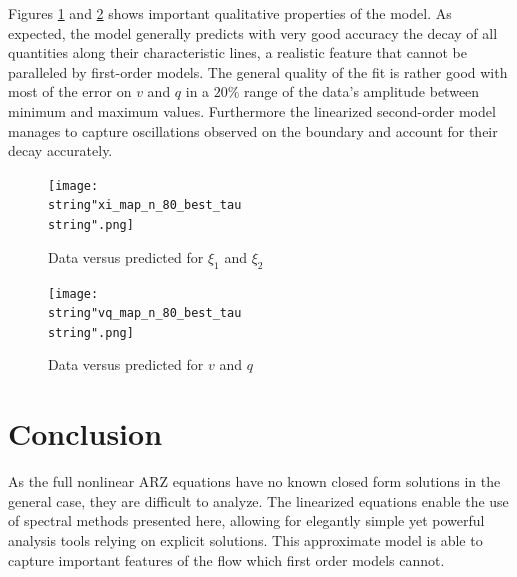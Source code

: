 \documentclass[a4paper, 10pt, conference]{ieeeconf}      %
\begin{document}
Figures \ref{fig:xi_1_xi_2_data_vs_sim} and \ref{fig:v_q_data_vs_sim} shows important qualitative properties of the model. As expected, the model generally predicts with very good accuracy the decay of all quantities along their characteristic lines, a realistic feature that cannot be paralleled by first-order models. The general quality of the fit is rather good with most of the error on $v$ and $q$ in a $20\%$ range of the data's amplitude between minimum and maximum values. Furthermore the linearized second-order model manages to capture oscillations observed on the boundary and account for their decay accurately.

\begin{figure}
\centering
\texttt{[image: \\string"xi\_map\_n\_80\_best\_tau\\string".png]}
\protect\caption{Data versus predicted for $\xi_1$ and $\xi_2$\label{fig:xi_1_xi_2_data_vs_sim}}
\end{figure}

\begin{figure}
\centering
\texttt{[image: \\string"vq\_map\_n\_80\_best\_tau\\string".png]}
\protect\caption{Data versus predicted for $v$ and $q$\label{fig:v_q_data_vs_sim}}
\end{figure}


\section{Conclusion}

As the full nonlinear ARZ equations have no known closed form solutions in the general case, they are difficult to analyze. The linearized equations enable the use of spectral methods presented here, allowing for elegantly simple yet powerful analysis tools relying on explicit solutions. This approximate model is able to capture important features of the flow which first order models cannot. 
\end{document}
